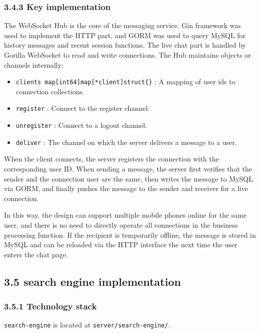\documentclass{article}
\begin{document}
\subsubsection{3.4.3 Key implementation}

The WebSocket Hub is the core of the messaging service. Gin framework was used to implement the HTTP part, and GORM was used to query MySQL for history messages and recent session functions. The live chat part is handled by Gorilla WebSocket to read and write connections. The Hub maintains objects or channels internally:

\begin{itemize}
    \item \texttt{clients map[int64]map[*client]struct\{\}} : A mapping of user ids to connection collections.
    \item \texttt{register} : Connect to the register channel.
    \item \texttt{unregister} : Connect to a logout channel.
    \item \texttt{deliver} : The channel on which the server delivers a message to a user.
\end{itemize}

When the client connects, the server registers the connection with the corresponding user ID. When sending a message, the server first verifies that the sender and the connection user are the same, then writes the message to MySQL via GORM, and finally pushes the message to the sender and receiver for a live connection.

In this way, the design can support multiple mobile phones online for the same user, and there is no need to directly operate all connections in the business processing function. If the recipient is temporarily offline, the message is stored in MySQL and can be reloaded via the HTTP interface the next time the user enters the chat page.

\subsection{3.5 search engine implementation}

\subsubsection{3.5.1 Technology stack}

\texttt{search-engine} is located at \texttt{server/search-engine/}.
\end{document}
